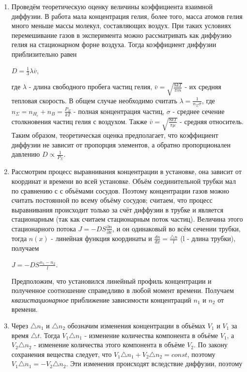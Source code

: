 \documentclass{article}
\begin{document}
\begin{enumerate}
\item Проведём теоретическую оценку величины коэффициента взаимной диффузии. В работа мала концентрация гелия, более того, масса атомов гелия много меньше массы молекул, составляющих воздух. При таких условиях перемешивание газов в эксперимента можно рассматривать как диффузию гелия на стационарном форне воздуха. Тогда коэффициент диффузии приблизительно равен
\begin{center}
$D = \frac{1}{3}\lambda \bar v$,
\end{center}
где $\lambda$ - длина свободного пробега частиц гелия, $\bar v = \sqrt{\frac{8kT}{\pi m}}$ - их средняя тепловая скорость. В общем случае необходимо считать $\lambda = \frac{1}{n_\Sigma \sigma}$, где $n_\Sigma = n_H_e + n_B = \frac{P_\Sigma}{kT}$ - полная концентрация частиц, $\sigma$ -  среднее сечение столкновения частиц гелия с воздухом. Также  $\bar v = \sqrt{\frac{8kT}{\pi \mu}}$ - средняя относитель. Таким образом, теоретическая оценка предполагает, что коэффициент диффузии не зависит от пропорция элементов, а обратно пропорционален давлению $D \propto \frac{1}{P_\Sigma}$.
\item  Рассмотрим процесс выравнивания концентрации в установке, она зависит от координат и времени во всей установке. Объём соединительной трубки мал по сравнению с с объёмами сосудов. Поэтому концентрации газов можно считать постоянной по всему объёму сосудов; считаем, что процесс выравнивания происходит только за счёт диффузии в трубке и является стационарным (так как считаем стационарным поток частиц). Величина этого стационарного потока $J = -DS\frac{\partial n}{\partial x}$, и он одинаковый во всём сечении трубки, тогда $n(x)$ - линейная функция координаты и $\frac{dn}{dx} = \frac{\triangle n}{l}$ (l - длина трубки), получаем 
\begin{center}
$J = -DS \frac{n_1-n_2}{l}$.
\end{center}
Предположим, что установился линейный профиль концентрации и полученное соотношение справедливо в любой момент времени. Получаем {\sl квазистационарное} приближение зависимости концентраций $n_1$ и $n_2$ от времени.
\item Через $\triangle n_1$ и $\triangle n_2$ обозначим изменения концентрации в объёмах $V_1$ и $V_1$ за время $\triangle t$. Тогда $V_1 \triangle n_1$ - изменение количества компонента в объёме $V_1$, а $V_2 \triangle n_2$ - изменение количества этого компонента в объёме $V_2$. По закону сохранения вещества следует, что $V_1 \triangle n_1 + V_2 \triangle n_2 = const$, поэтому $V_1 \triangle n_1 = - V_2 \triangle n_2$. Эти изменения происходят вследствие диффузии, поэтому 

\end{enumerate}
\end{document}
